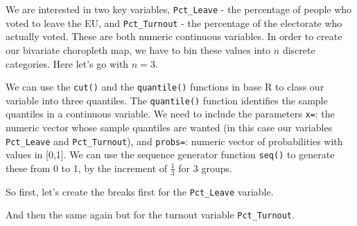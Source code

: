 \documentclass[
]{book}
\newenvironment{Shaded}{\begin{snugshade}}{\end{snugshade}}
\newcommand{\AttributeTok}[1]{\textcolor[rgb]{0.77,0.63,0.00}{#1}}
\newcommand{\CommentTok}[1]{\textcolor[rgb]{0.56,0.35,0.01}{\textit{#1}}}
\newcommand{\ConstantTok}[1]{\textcolor[rgb]{0.00,0.00,0.00}{#1}}
\newcommand{\DecValTok}[1]{\textcolor[rgb]{0.00,0.00,0.81}{#1}}
\newcommand{\FunctionTok}[1]{\textcolor[rgb]{0.00,0.00,0.00}{#1}}
\newcommand{\NormalTok}[1]{#1}
\newcommand{\OtherTok}[1]{\textcolor[rgb]{0.56,0.35,0.01}{#1}}
\newcommand{\SpecialCharTok}[1]{\textcolor[rgb]{0.00,0.00,0.00}{#1}}
\begin{document}
We are interested in two key variables, \texttt{Pct\_Leave} - the percentage of people who voted to leave the EU, and \texttt{Pct\_Turnout} - the percentage of the electorate who actually voted. These are both numeric continuous variables. In order to create our bivariate choropleth map, we have to bin these values into \(n\) discrete categories. Here let's go with \(n = 3\).

We can use the \texttt{cut()} and the \texttt{quantile()} functions in base R to class our variable into three quantiles. The \texttt{quantile()} function identifies the sample quantiles in a continuous variable. We need to include the parameters \texttt{x=}: the numeric vector whose sample quantiles are wanted (in this case our variables \texttt{Pct\_Leave} and \texttt{Pct\_Turnout}), and \texttt{probs=}: numeric vector of probabilities with values in {[}0,1{]}. We can use the sequence generator function \texttt{seq()} to generate these from 0 to 1, by the increment of \(\frac{1}{3}\) for 3 groups.

So first, let's create the breaks first for the \texttt{Pct\_Leave} variable.

\begin{Shaded}
\end{Shaded}

And then the same again but for the turnout variable \texttt{Pct\_Turnout}.

\begin{Shaded}
\end{Shaded}
\end{document}
